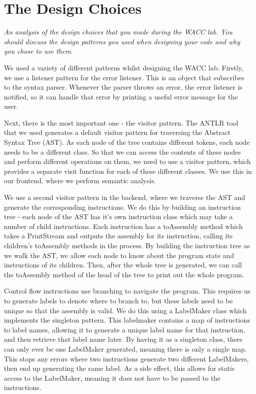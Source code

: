 \documentclass[]{article}
\newcommand{\spec}[1]{\textit{#1}\par\noindent}
\begin{document}
\section{The Design Choices}
\spec{An analysis of the design choices that you made during the WACC lab. You should discuss the design patterns you used when designing your code and why you chose to use them.}
We used a variety of different patterns whilst designing the WACC lab. Firstly, we use a listener pattern for the error listener. This is an object that subscribes to the syntax parser. Whenever the parser throws an error, the error listener is notified, so it can handle that error by printing a useful error message for the user.

Next, there is the most important one - the visitor pattern. The ANTLR tool that we used generates a default visitor pattern for traversing the Abstract Syntax Tree (AST). As each node of the tree contains different tokens, each node needs to be a different class. So that we can access the contents of these nodes and perform different operations on them, we need to use a visitor pattern, which provides a separate visit function for each of these different classes. We use this in our frontend, where we perform semantic analysis.

We use a second visitor pattern in the backend, where we traverse the AST and generate the corresponding instructions. We do this by building an instruction tree - each node of the AST has it's own instruction class which may take a number of child instructions. Each instruction has a toAssembly method which takes a PrintStream and outputs the assembly for its instruction, calling its children's toAssembly methods in the process. By building the instruction tree as we walk the AST, we allow each node to know about the program state and instructions of its children. Then, after the whole tree is generated, we can call the toAssembly method of the head of the tree to print out the whole program.

Control flow instructions use branching to navigate the program. This requires us to generate labels to denote where to branch to, but these labels need to be unique so that the assembly is valid. We do this using a LabelMaker class which implements the singleton pattern. This labelmaker contains a map of instructions to label names, allowing it to generate a unique label name for that instruction, and then retrieve that label name later. By having it as a singleton class, there can only ever be one LabelMaker generated, meaning there is only a single map. This stops any errors where two instructions generate two different LabelMakers, then end up generating the same label. As a side effect, this allows for static access to the LabelMaker, meaning it does not have to be passed to the instructions.
\end{document}
